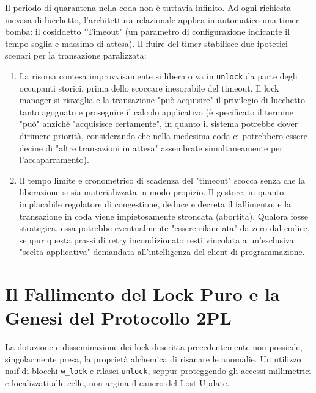Il periodo di quarantena nella coda non è tuttavia infinito. Ad ogni richiesta inevasa di lucchetto, l'architettura relazionale applica in automatico una timer-bomba: il cosiddetto "Timeout" (un parametro di configurazione indicante il tempo soglia e massimo di attesa). Il fluire del timer stabilisce due ipotetici scenari per la transazione paralizzata:
\begin{enumerate}
    \item La risorsa contesa improvvisamente si libera o va in \texttt{unlock} da parte degli occupanti storici, prima dello scoccare inesorabile del timeout. Il lock manager si risveglia e la transazione "può acquisire" il privilegio di lucchetto tanto agognato e proseguire il calcolo applicativo (è specificato il termine "può" anziché "acquisisce certamente", in quanto il sistema potrebbe dover dirimere priorità, considerando che nella medesima coda ci potrebbero essere decine di "altre transazioni in attesa" assembrate simultaneamente per l'accaparramento).
    \item Il tempo limite e cronometrico di scadenza del "timeout" scocca senza che la liberazione si sia materializzata in modo propizio. Il gestore, in quanto implacabile regolatore di congestione, deduce e decreta il fallimento, e la transazione in coda viene impietosamente stroncata (abortita). Qualora fosse strategica, essa potrebbe eventualmente "essere rilanciata" da zero dal codice, seppur questa prassi di retry incondizionato resti vincolata a un'esclusiva "scelta applicativa" demandata all'intelligenza del client di programmazione.
\end{enumerate}

\section{Il Fallimento del Lock Puro e la Genesi del Protocollo 2PL}

La dotazione e disseminazione dei lock descritta precedentemente non possiede, singolarmente presa, la proprietà alchemica di risanare le anomalie. Un utilizzo naif di blocchi \texttt{w\_lock} e rilasci \texttt{unlock}, seppur proteggendo gli accessi millimetrici e localizzati alle celle, non argina il cancro del Lost Update.

